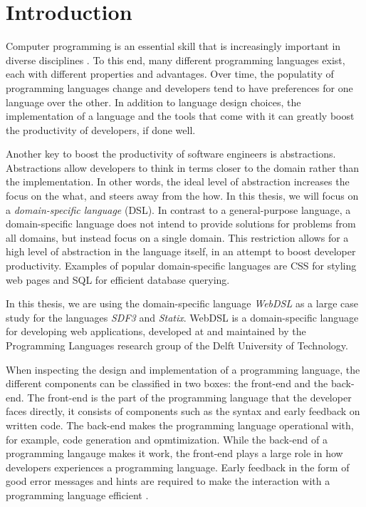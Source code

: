 
\chapter{\label{chap:introduction}Introduction}

  Computer programming is an essential skill that is increasingly important in diverse disciplines \autocite{Rafalski2019}. To this end, many different programming languages exist, each with different properties and advantages. Over time, the populatity of programming languages change and developers tend to have preferences for one language over the other. In addition to language design choices, the implementation of a language and the tools that come with it can greatly boost the productivity of developers, if done well.

  Another key to boost the productivity of software engineers is abstractions. Abstractions allow developers to think in terms closer to the domain rather than the implementation. In other words, the ideal level of abstraction increases the focus on the what, and steers away from the how. In this thesis, we will focus on a \textit{domain-specific language} (DSL). In contrast to a general-purpose language, a domain-specific language does not intend to provide solutions for problems from all domains, but instead focus on a single domain. This restriction allows for a high level of abstraction in the language itself, in an attempt to boost developer productivity. Examples of popular domain-specific languages are CSS for styling web pages and SQL for efficient database querying.

  In this thesis, we are using the domain-specific language \textit{WebDSL} as a large case study for the languages \textit{SDF3} and \textit{Statix}. WebDSL is a domain-specific language for developing web applications, developed at and maintained by the Programming Languages research group of the Delft University of Technology.

  When inspecting the design and implementation of a programming language, the different components can be classified in two boxes: the front-end and the back-end. The front-end is the part of the programming language that the developer faces directly, it consists of components such as the syntax and early feedback on written code. The back-end makes the programming language operational with, for example, code generation and opmtimization. While the back-end of a programming langauge makes it work, the front-end plays a large role in how developers experiences a programming language. Early feedback in the form of good error messages and hints are required to make the interaction with a programming language efficient \autocite{Becker2019}.

